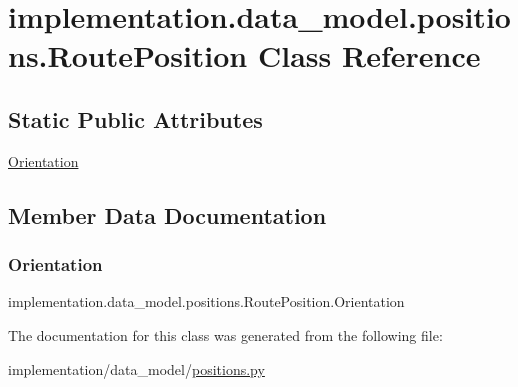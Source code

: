 \hypertarget{classimplementation_1_1data__model_1_1positions_1_1_route_position}{}\section{implementation.\+data\+\_\+model.\+positions.\+Route\+Position Class Reference}
\label{classimplementation_1_1data__model_1_1positions_1_1_route_position}
\subsection*{Static Public Attributes}
\begin{DoxyCompactItemize}
\item 
\hyperlink{classimplementation_1_1data__model_1_1positions_1_1_route_position_ac021d8b93dfea605c9dbbe00b1b15599}{Orientation}
\end{DoxyCompactItemize}


\subsection{Member Data Documentation}
\mbox{\label{classimplementation_1_1data__model_1_1positions_1_1_route_position_ac021d8b93dfea605c9dbbe00b1b15599}} 
\subsubsection{\texorpdfstring{Orientation}{Orientation}}
{\footnotesize\ttfamily implementation.\+data\+\_\+model.\+positions.\+Route\+Position.\+Orientation\hspace{0.3cm}{\ttfamily [static]}}



The documentation for this class was generated from the following file\+:\begin{DoxyCompactItemize}
\item 
implementation/data\+\_\+model/\hyperlink{positions_8py}{positions.\+py}\end{DoxyCompactItemize}

